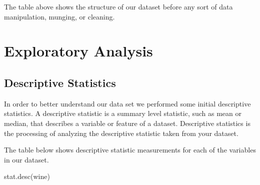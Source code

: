 \documentclass[
]{book}
\newenvironment{Shaded}{\begin{snugshade}}{\end{snugshade}}
\newcommand{\FunctionTok}[1]{\textcolor[rgb]{0.00,0.00,0.00}{#1}}
\newcommand{\NormalTok}[1]{#1}
\begin{document}
The table above shows the structure of our dataset before any sort of data manipulation, munging, or cleaning.

\hypertarget{exploratory-analysis}{%
\section{Exploratory Analysis}\label{exploratory-analysis}}

\hypertarget{descriptive-statistics-1}{%
\subsection{Descriptive Statistics}\label{descriptive-statistics-1}}

In order to better understand our data set we performed some initial descriptive statistics. A descriptive statistic is a summary level statistic, such as mean or median, that describes a variable or feature of a dataset. Descriptive statistics is the processing of analyzing the descriptive statistic taken from your dataset. \citet{descrip_stat}

The table below shows descriptive statistic measurements for each of the variables in our dataset.

\begin{Shaded}
\begin{Highlighting}[]
\FunctionTok{stat.desc}\NormalTok{(wine)}
\end{Highlighting}
\end{Shaded}
\end{document}
